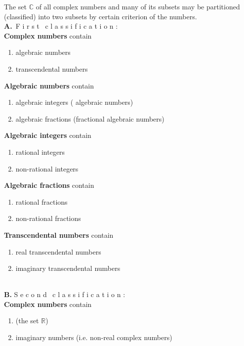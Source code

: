\documentclass[12pt]{article}
\theoremstyle{definition}
\begin{document}
 

The set $\mathbb{C}$ of all complex numbers and many of its subsets may be 
partitioned (classified) into two subsets by certain criterion of the numbers.\\

\textbf{A.}\, F i r s t \, c l a s s i f i c a t i o n :\\

\textbf{Complex numbers} contain
\begin{enumerate}
\item algebraic numbers
\item transcendental numbers
\end{enumerate}

\textbf{Algebraic numbers} contain
\begin{enumerate}
\item algebraic integers ( algebraic numbers)
\item algebraic fractions (fractional algebraic numbers)
\end{enumerate}

\textbf{Algebraic integers} contain
\begin{enumerate}
\item rational integers
\item non-rational integers
\end{enumerate}

\textbf{Algebraic fractions} contain
\begin{enumerate}
\item rational fractions
\item non-rational fractions
\end{enumerate}

\textbf{Transcendental numbers} contain
\begin{enumerate}
\item real transcendental numbers
\item imaginary transcendental numbers
\end{enumerate}
$$ $$\\
\textbf{B.}\; S e c o n d \, c l a s s i f i c a t i o n :\\

\textbf{Complex numbers} contain
\begin{enumerate}
\item {} (the set $\mathbb{R}$)
\item imaginary numbers (i.e. non-real complex numbers)
\end{enumerate}
\end{document}
